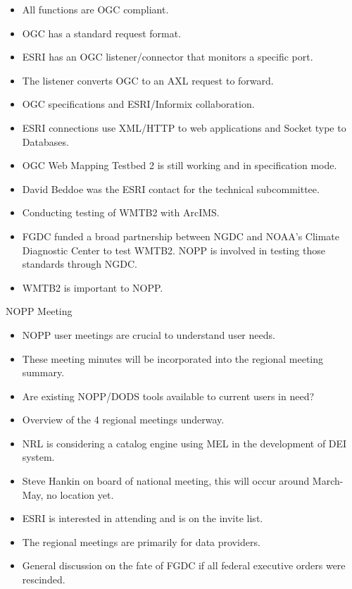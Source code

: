 \begin{itemize}
\item All functions are OGC compliant.
\item OGC has a standard request format.
\item ESRI has an OGC listener/connector that monitors a specific port.
\item The listener converts OGC to an AXL request to forward.
\item OGC specifications and ESRI/Informix collaboration.
\item ESRI connections use XML/HTTP to web applications and Socket type to Databases.
\item OGC Web Mapping Testbed 2 is still working and in specification mode.
\item David Beddoe was the ESRI contact for the technical subcommittee.
\item Conducting testing of WMTB2 with ArcIMS.
\item FGDC funded a broad partnership between NGDC and NOAA's Climate Diagnostic 
Center to test WMTB2. NOPP is involved in testing those standards through NGDC. 
\item WMTB2 is important to NOPP.
\end{itemize}

        NOPP Meeting

\begin{itemize}
\item NOPP user meetings are crucial to understand user needs.
\item These meeting minutes will be incorporated into the regional meeting summary.
\item Are existing NOPP/DODS tools available to current users in need?
\item Overview of the 4 regional meetings underway.
\item NRL is considering a catalog engine using MEL in the development of DEI system.
\item Steve Hankin on board of national meeting, this will occur around March-May, no 
location yet.
\item ESRI is interested in attending and is on the invite list.
\item The regional meetings are primarily for data providers.
\item General discussion on the fate of FGDC if all federal executive orders were rescinded.
\end{itemize}





